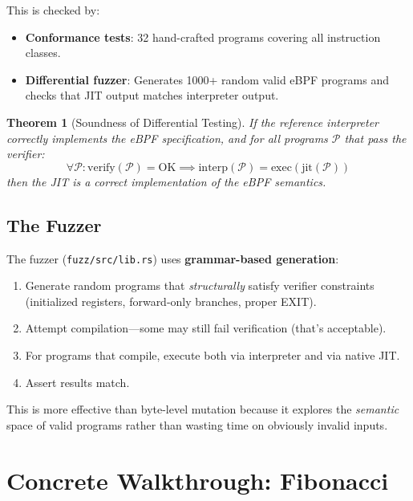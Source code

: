 \documentclass[11pt,letterpaper]{article}
\newtheorem{theorem}{Theorem}
\begin{document}
This is checked by:
\begin{itemize}
    \item \textbf{Conformance tests}: 32 hand-crafted programs covering all instruction classes.
    \item \textbf{Differential fuzzer}: Generates 1000+ random valid eBPF programs and checks that JIT output matches interpreter output.
\end{itemize}

\begin{theorem}[Soundness of Differential Testing]
If the reference interpreter correctly implements the eBPF specification, and for all programs $\mathcal{P}$ that pass the verifier:
\[
\forall \mathcal{P}: \text{verify}(\mathcal{P}) = \text{OK} \implies \text{interp}(\mathcal{P}) = \text{exec}(\text{jit}(\mathcal{P}))
\]
then the JIT is a correct implementation of the eBPF semantics.
\end{theorem}

\subsection{The Fuzzer}

The fuzzer (\texttt{fuzz/src/lib.rs}) uses \textbf{grammar-based generation}:
\begin{enumerate}
    \item Generate random programs that \emph{structurally} satisfy verifier constraints (initialized registers, forward-only branches, proper EXIT).
    \item Attempt compilation---some may still fail verification (that's acceptable).
    \item For programs that compile, execute both via interpreter and via native JIT.
    \item Assert results match.
\end{enumerate}

This is more effective than byte-level mutation because it explores the \emph{semantic} space of valid programs rather than wasting time on obviously invalid inputs.

\section{Concrete Walkthrough: Fibonacci}
\label{sec:walkthrough}
\end{document}
